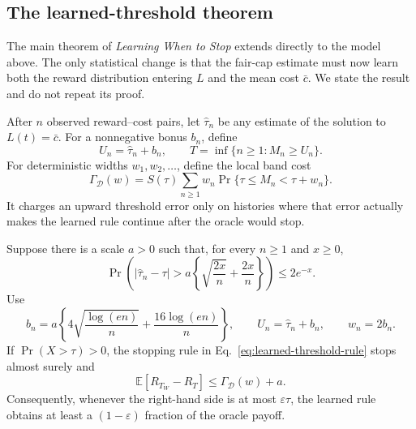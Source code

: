 \subsection{The learned-threshold theorem}

The main theorem of \emph{Learning When to Stop} extends directly to the
model above.  The only statistical change is that the fair-cap estimate must
now learn both the reward distribution entering $L$ and the mean cost
$\bar c$.  We state the result and do not repeat its proof.

After $n$ observed reward--cost pairs, let $\widehat\tau_n$ be any estimate of
the solution to $L(t)=\bar c$.  For a nonnegative bonus $b_n$, define
\begin{equation}
  U_n=\widehat\tau_n+b_n,
  \qquad
  T=\inf\{n\ge1:M_n\ge U_n\}.
  \label{eq:learned-threshold-rule}
\end{equation}
For deterministic widths $w_1,w_2,\ldots$, define the local band cost
\begin{equation}
  \Gamma_{\mathcal D}(w)
  =S(\tau)\sum_{n\ge1}
    w_n\Pr\{\tau\le M_n<\tau+w_n\}.
  \label{eq:local-band}
\end{equation}
It charges an upward threshold error only on histories where that error
actually makes the learned rule continue after the oracle would stop.

\begin{theorem}
\label{thm:random-cost-reduction}
Suppose there is a scale $a>0$ such that, for every $n\ge1$ and $x\ge0$,
\begin{equation}
 \Pr\!\left(
  |\widehat\tau_n-\tau|>
  a\left\{\sqrt{\frac{2x}{n}}+\frac{2x}{n}\right\}
 \right)\le2e^{-x}.
 \label{eq:random-cost-concentration}
\end{equation}
Use
\begin{equation}
 b_n=a\left\{
       4\sqrt{\frac{\log(en)}{n}}
       +\frac{16\log(en)}{n}
     \right\},
 \qquad U_n=\widehat\tau_n+b_n,
 \qquad w_n=2b_n.
 \label{eq:random-cost-bonus}
\end{equation}
If $\Pr(X>\tau)>0$, the stopping rule in
Eq.~\eqref{eq:learned-threshold-rule} stops almost surely and
\begin{equation}
  \mathbb E[R_{T_W}-R_T]
  \le \Gamma_{\mathcal D}(w)+a.
  \label{eq:random-cost-guarantee}
\end{equation}
Consequently, whenever the right-hand side is at most $\varepsilon\tau$, the
learned rule obtains at least a $(1-\varepsilon)$ fraction of the oracle
payoff.
\end{theorem}

